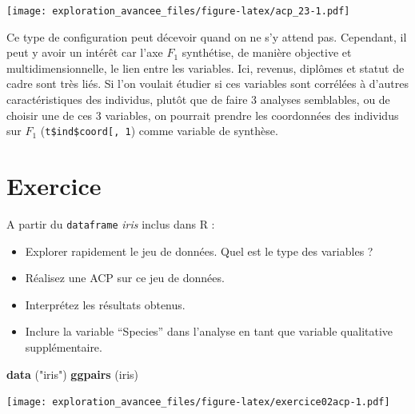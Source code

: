 \documentclass[]{book}
\newenvironment{Shaded}{\begin{snugshade}}{\end{snugshade}}
\newcommand{\KeywordTok}[1]{\textcolor[rgb]{0.13,0.29,0.53}{\textbf{#1}}}
\newcommand{\NormalTok}[1]{#1}
\newcommand{\StringTok}[1]{\textcolor[rgb]{0.31,0.60,0.02}{#1}}
\providecommand{\tightlist}{%
  \setlength{\itemsep}{0pt}\setlength{\parskip}{0pt}}
\begin{document}
\texttt{[image: exploration\_avancee\_files/figure-latex/acp\_23-1.pdf]}

Ce type de configuration peut décevoir quand on ne s'y attend pas. Cependant, il peut y avoir un intérêt car l'axe \(F_1\) synthétise, de manière objective et multidimensionnelle, le lien entre les variables. Ici, revenus, diplômes et statut de cadre sont très liés. Si l'on voulait étudier si ces variables sont corrélées à d'autres caractéristiques des individus, plutôt que de faire 3 analyses semblables, ou de choisir une de ces 3 variables, on pourrait prendre les coordonnées des individus sur \(F_1\) (\texttt{t\$ind\$coord{[},\ 1}) comme variable de synthèse.

\hypertarget{exercice}{%
\section{Exercice}\label{exercice}}

A partir du \texttt{dataframe} \emph{iris} inclus dans R :

\begin{itemize}
\tightlist
\item
  Explorer rapidement le jeu de données. Quel est le type des variables ?
\item
  Réalisez une ACP sur ce jeu de données.
\item
  Interprétez les résultats obtenus.
\item
  Inclure la variable ``Species'' dans l'analyse en tant que variable qualitative supplémentaire.
\end{itemize}

\begin{Shaded}
\begin{Highlighting}[]
\KeywordTok{data}\NormalTok{ (}\StringTok{"iris"}\NormalTok{)}
\KeywordTok{ggpairs}\NormalTok{ (iris)}
\end{Highlighting}
\end{Shaded}

\texttt{[image: exploration\_avancee\_files/figure-latex/exercice02acp-1.pdf]}
\end{document}
